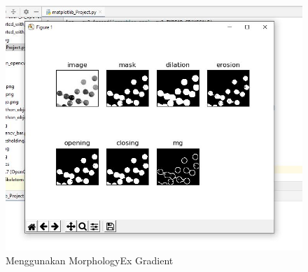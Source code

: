 \begin{figure}[ht]
\centering
\includegraphics[scale=0.52]{figures/2,57.jpg}
\caption{Menggunakan MorphologyEx Gradient}
\label{contoh}
\end{figure}






\newpage

